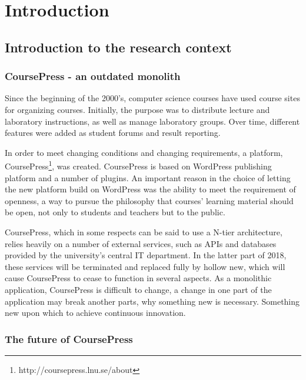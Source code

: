 \chapter{Introduction}
\section{Introduction to the research context}

\subsection{CoursePress - an outdated monolith}

Since the beginning of the 2000's, computer science courses have used course sites for organizing courses. Initially, the purpose was to distribute lecture and laboratory instructions, as well as manage laboratory groups. Over time, different features were added as student forums and result reporting.

In order to meet changing conditions and changing requirements, a platform, CoursePress\footnote{http://coursepress.lnu.se/about}, was created. CoursePress is based on WordPress publishing platform and a number of plugins. An important reason in the choice of letting the new platform build on WordPress was the ability to meet the requirement of openness, a way to pursue the philosophy that courses’ learning material should be open, not only to students and teachers but to the public.

CoursePress, which in some respects can be said to use a N-tier architecture, relies heavily on a number of external services, such as APIs and databases provided by the university's central IT department. In the latter part of 2018, these services will be terminated and replaced fully by hollow new, which will cause CoursePress to cease to function in several aspects. As a monolithic application, CoursePress is difficult to change, a change in one part of the application may break another parts, why something new is necessary. Something new upon which to achieve continuous innovation.

\subsection{The future of CoursePress}

